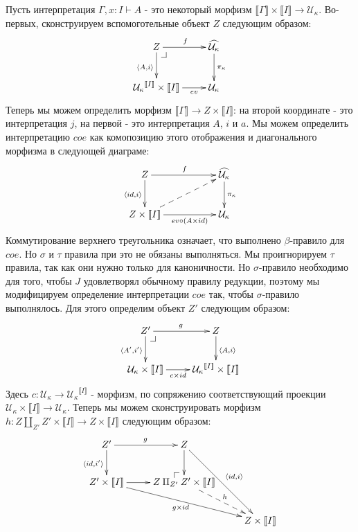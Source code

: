 \documentclass{amsart}
\makeatletter
\theoremstyle{definition}
\theoremstyle{remark}
\renewcommand{\ll}{\llbracket}
\newcommand{\rr}{\rrbracket}
\numberwithin{figure}{section}
\newcommand{\pb}[1][dr]{\save*!/#1-1.2pc/#1:(-1,1)@^{|-}\restore}
\newcommand{\po}[1][dr]{\save*!/#1+1.2pc/#1:(1,-1)@^{|-}\restore}
\makeatother
\begin{document}
\begin{itemize}
Пусть интерпретация $\Gamma, x : I \vdash A$ - это некоторый морфизм $\ll \Gamma \rr \times \ll I \rr \to \mathcal{U}_\kappa$.
Во-первых, сконструируем вспомоготельные объект $Z$ следующим образом:
\[ \xymatrix{ Z \ar[r]^f \ar[d]_{\langle A, i \rangle} \pb                   & \widehat{\mathcal{U}_\kappa} \ar[d]^{\pi_\kappa} \\
              {\mathcal{U}_\kappa}^{\ll I \rr} \times \ll I \rr \ar[r]_-{ev} & \mathcal{U}_\kappa
            }\]
Теперь мы можем определить морфизм $\ll \Gamma \rr \to Z \times \ll I \rr$: на второй координате - это интерпретация $j$, на первой - это интерпретация $A$, $i$ и $a$.
Мы можем определить интерпретацию $coe$ как комопозицию этого отображения и диагонального морфизма в следующей диаграме:
\[ \xymatrix{ Z \ar[rr]^f \ar[d]_{\langle id, i \rangle}                          & & \widehat{\mathcal{U}_\kappa} \ar[d]^{\pi_\kappa} \\
              Z \times \ll I \rr \ar[rr]_-{ev \circ (A \times id)} \ar@{-->}[urr] & & \mathcal{U}_\kappa
            }\]
Коммутирование верхнего треугольника означает, что выполнено $\beta$-правило для $coe$.
Но $\sigma$ и $\tau$ правила при это не обязаны выполняться.
Мы проигнорируем $\tau$ правила, так как они нужно только для каноничности.
Но $\sigma$-правило необходимо для того, чтобы $J$ удовлетворял обычному правилу редукции, поэтому мы модифицируем определение интерпретации $coe$ так, чтобы $\sigma$-правило выполнялось.
Для этого определим объект $Z'$ следующим образом:
\[ \xymatrix{ Z' \ar[r]^g \ar[d]_{\langle A', i' \rangle} \pb           & Z \ar[d]^{\langle A, i \rangle} \\
              \mathcal{U}_\kappa \times \ll I \rr \ar[r]_-{c \times id} & {\mathcal{U}_\kappa}^{\ll I \rr} \times \ll I \rr
            }\]
Здесь $c : \mathcal{U}_\kappa \to {\mathcal{U}_\kappa}^{\ll I \rr}$ - морфизм, по сопряжению соответствующий проекции $\mathcal{U}_\kappa \times \ll I \rr \to \mathcal{U}_\kappa$.
Теперь мы можем сконструировать морфизм $h : Z \amalg_{Z'} Z' \times \ll I \rr \to Z \times \ll I \rr$ следующим образом:
\[ \xymatrix{ Z' \ar[r]^g \ar[d]_{\langle id, i' \rangle}       & Z \ar[d] \ar[rdd]^{\langle id, i \rangle}             & \\
              Z' \times \ll I \rr \ar[r] \ar[rrd]_{g \times id} & \po Z \amalg_{Z'} Z' \times \ll I \rr \ar@{-->}[rd]^h & \\
                                                                &                                                       & Z \times \ll I \rr
            }\]

\end{itemize}
\end{document}
